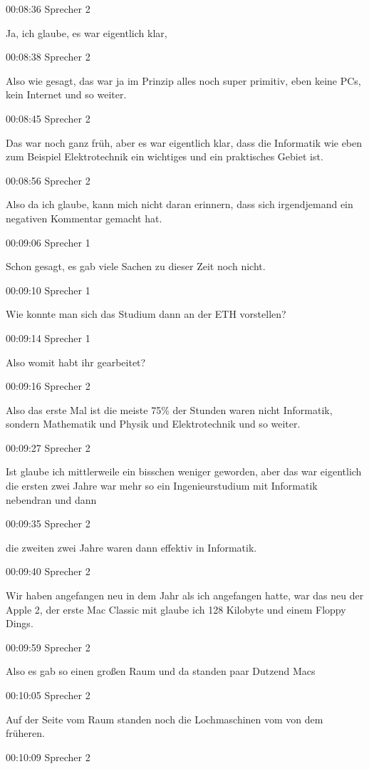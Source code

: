 00:08:36 Sprecher 2

Ja, ich glaube, es war eigentlich klar,

00:08:38 Sprecher 2

Also wie gesagt, das war ja im Prinzip alles noch super primitiv, eben
keine PCs, kein Internet und so weiter.

00:08:45 Sprecher 2

Das war noch ganz früh, aber es war eigentlich klar, dass die Informatik
wie eben zum Beispiel Elektrotechnik ein wichtiges und ein praktisches
Gebiet ist.

00:08:56 Sprecher 2

Also da ich glaube, kann mich nicht daran erinnern, dass sich
irgendjemand ein negativen Kommentar gemacht hat.

00:09:06 Sprecher 1

Schon gesagt, es gab viele Sachen zu dieser Zeit noch nicht.

00:09:10 Sprecher 1

Wie konnte man sich das Studium dann an der ETH vorstellen?

00:09:14 Sprecher 1

Also womit habt ihr gearbeitet?

00:09:16 Sprecher 2

Also das erste Mal ist die meiste 75\% der Stunden waren nicht
Informatik, sondern Mathematik und Physik und Elektrotechnik und so
weiter.

00:09:27 Sprecher 2

Ist glaube ich mittlerweile ein bisschen weniger geworden, aber das war
eigentlich die ersten zwei Jahre war mehr so ein Ingenieurstudium mit
Informatik nebendran und dann

00:09:35 Sprecher 2

die zweiten zwei Jahre waren dann effektiv in Informatik.

00:09:40 Sprecher 2

Wir haben angefangen neu in dem Jahr als ich angefangen hatte, war das
neu der Apple 2, der erste Mac Classic mit glaube ich 128 Kilobyte und
einem Floppy Dings.

00:09:59 Sprecher 2

Also es gab so einen großen Raum und da standen paar Dutzend Macs

00:10:05 Sprecher 2

Auf der Seite vom Raum standen noch die Lochmaschinen vom von dem
früheren.

00:10:09 Sprecher 2


